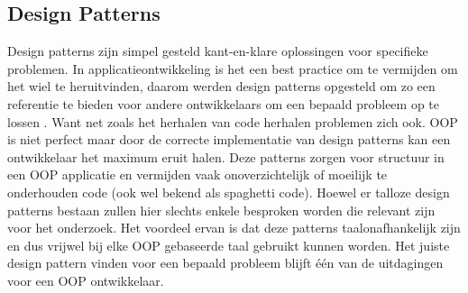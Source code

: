 \subsection{Design Patterns}
Design patterns zijn simpel gesteld kant-en-klare oplossingen voor specifieke problemen. In applicatieontwikkeling is het een best practice om te vermijden om het wiel te heruitvinden, daarom werden design patterns opgesteld om zo een referentie te bieden voor andere ontwikkelaars om een bepaald probleem op te lossen \autocite{Gamma1994}.  Want net zoals het herhalen van code herhalen problemen zich ook. OOP is niet perfect maar door de correcte implementatie van design patterns kan een ontwikkelaar het maximum eruit halen. Deze patterns zorgen voor structuur in een OOP applicatie en vermijden vaak onoverzichtelijk of moeilijk te onderhouden code (ook wel bekend als spaghetti code). Hoewel er talloze design patterns bestaan zullen hier slechts enkele besproken worden die relevant zijn voor het onderzoek. Het voordeel ervan is dat deze patterns taalonafhankelijk zijn en dus vrijwel bij elke OOP gebaseerde taal gebruikt kunnen worden. Het juiste design pattern vinden voor een bepaald probleem blijft één van de uitdagingen voor een OOP ontwikkelaar.

